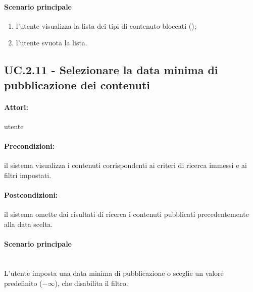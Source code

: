 \documentclass[10pt,a4paper,headinclude,footinclude,hidelinks]{scrreprt} %
\begin{document}
	\paragraph{Scenario principale}
	\begin{enumerate}
	\item l'utente visualizza la lista dei tipi di contenuto bloccati ();
	\item l'utente svuota la lista.
	\end{enumerate}

	\subsection[UC.2.11]{UC.2.11 - Selezionare la data minima di pubblicazione dei contenuti}
	\label{sec:stage:ar:uc:2_11}
	\paragraph{Attori:} utente
	\paragraph{Precondizioni:} il sistema visualizza i contenuti corrispondenti ai criteri di ricerca immessi e ai filtri impostati.
	\paragraph{Postcondizioni:} il sistema omette dai risultati di ricerca i contenuti pubblicati precedentemente alla data scelta.
	\paragraph{Scenario principale} \hfill \\
	L'utente imposta una data minima di pubblicazione o sceglie un valore predefinito ($-\infty$), che disabilita il filtro.
\end{document}
